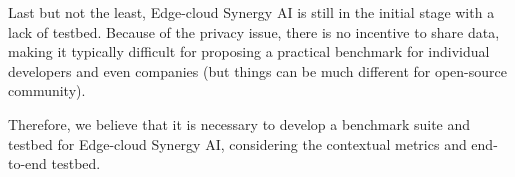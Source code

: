 Last but not the least, Edge-cloud Synergy AI is still in the initial stage with a lack of testbed. Because of the privacy issue, there is no incentive to share data, making it typically difficult for proposing a practical benchmark for individual developers and even companies (but things can be much different for open-source community).  

Therefore, we believe that it is necessary to develop a benchmark suite and testbed for Edge-cloud Synergy AI, considering the contextual metrics and end-to-end testbed.
